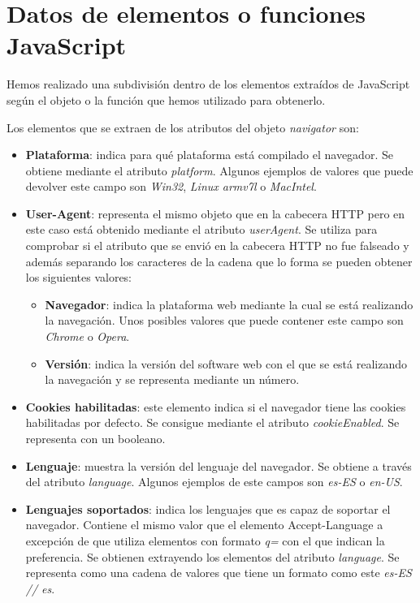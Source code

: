 \section{Datos de elementos o funciones JavaScript}
 Hemos realizado una subdivisión dentro de los elementos extraídos de JavaScript según el objeto o la función que hemos utilizado para obtenerlo.\par
\noindent Los elementos que se extraen de los atributos del objeto \textit{navigator}\cite{navigator} son:
\begin{itemize}
    \item \textbf{Plataforma}: indica para qué plataforma está compilado el navegador. Se obtiene mediante el atributo \textit{platform}. Algunos ejemplos de valores que puede devolver este campo son \textit{Win32}, \textit{Linux armv7l} o \textit{MacIntel}.
    \item \textbf{User-Agent}: representa el mismo objeto que en la cabecera HTTP pero en este caso está obtenido mediante el atributo \textit{userAgent}. Se utiliza para comprobar si el atributo que se envió en la cabecera HTTP no fue falseado y además separando los caracteres  de la cadena que lo forma se pueden obtener los siguientes valores:
    \begin{itemize}
        \item \textbf{Navegador}: indica la plataforma web mediante la cual se está realizando la navegación. Unos posibles valores que puede contener este campo son \textit{Chrome} o \textit{Opera}.
        \item \textbf{Versión}: indica la versión del software web con el que se está realizando la navegación y se representa mediante un número.
    \end{itemize}
    \item \textbf{Cookies habilitadas}: este elemento indica si el navegador tiene las cookies habilitadas por defecto. Se consigue mediante el atributo \textit{cookieEnabled}. Se representa con un booleano.
    \item \textbf{Lenguaje}: muestra la versión del lenguaje del navegador. Se obtiene a través del atributo \textit{language}. Algunos ejemplos de este campos son \textit{es-ES} o \textit{en-US}.
    \item \textbf{Lenguajes soportados}: indica los lenguajes que es capaz de soportar el navegador. Contiene el mismo valor que el elemento Accept-Language a excepción de que utiliza elementos con formato \textit{q=} con el que indican la preferencia. Se obtienen extrayendo los elementos del atributo \textit{language}. Se representa como una cadena de valores que tiene un formato como este \textit{es-ES // es}.

\end{itemize}
